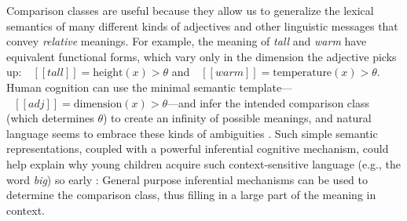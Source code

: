 \documentclass[doc, floatsintext]{apa6}
\newcommand{\denote}[1]{\mbox{ $[\![ #1 ]\!]$}}
\newcommand{\mht}[1]{\textcolor{Blue}{[mht: #1]}}
\begin{document}


Comparison classes are useful because they allow us to generalize the lexical semantics of many different kinds of adjectives and other linguistic messages that convey \emph{relative} meanings.
For example, the meaning of \emph{tall} and \emph{warm} have equivalent functional forms, which vary only in the dimension the adjective picks up: $\denote{tall} = \text{height}(x) > \theta$ and $\denote{warm} = \text{temperature}(x) > \theta$.
Human cognition can use the minimal semantic template---$\denote{adj} = \text{dimension}(x) > \theta$---and infer the intended comparison class (which determines $\theta$) to create an infinity of possible meanings, and natural language seems to embrace these kinds of ambiguities \cite{piantadosi2012communicative}.
Such simple semantic representations, coupled with a powerful inferential cognitive mechanism, could help explain why young children acquire such context-sensitive language (e.g., the word \emph{big}) so early \cite{Sera1987,Ebeling1988,Mintz2002,Sandhofer2007}: General purpose inferential mechanisms can be used to determine the comparison class, thus filling in a large part of the meaning in context.
\end{document}
